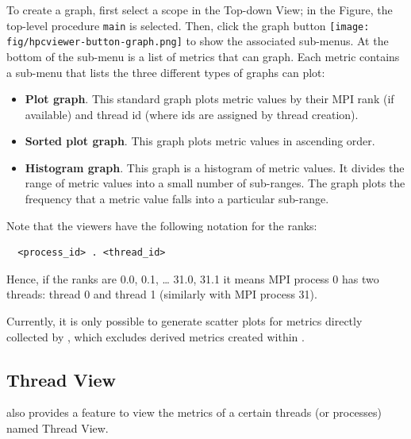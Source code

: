 To create a graph, first select a scope in the Top-down View; in the Figure, the top-level procedure \texttt{main} is selected.
Then, click the graph button \texttt{[image: fig/hpcviewer-button-graph.png]} to show the associated sub-menus.
At the bottom of the sub-menu is a list of metrics that \hpcviewer{} can graph.
Each metric contains a sub-menu that lists the three different types of graphs \hpcviewer{} can plot:

\begin{itemize}
\item \textbf{Plot graph}.
  This standard graph plots metric values by their MPI rank (if available) and thread id (where ids are assigned by thread creation).

\item \textbf{Sorted plot graph}.
  This graph plots metric values in ascending order.

\item \textbf{Histogram graph}.
  This graph is a histogram of metric values.
  It divides the range of metric values into a small number of sub-ranges.
  The graph plots the frequency that a metric value falls into a particular sub-range.
\end{itemize}

Note that the viewers have the following notation for the ranks:
\begin{verbatim}
  <process_id> . <thread_id>
\end{verbatim}
Hence, if the ranks are 0.0, 0.1, \dots{} 31.0, 31.1 it means MPI process 0 has two threads: thread 0 and thread 1 (similarly with MPI process 31). 

Currently, it is only possible to generate scatter plots for metrics directly collected by \hpcrun{}, which excludes derived metrics created within \hpcviewer{}.


\subsection{Thread View}
\label{sec:thread-level-table}

\hpcviewer{} also provides a feature to view the metrics of a certain threads (or processes) named Thread View.


